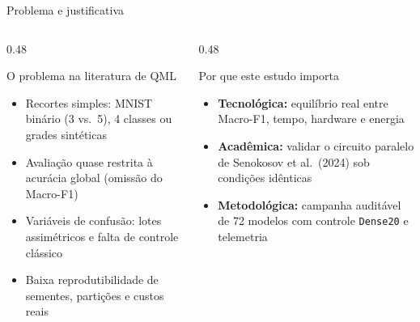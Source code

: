 \documentclass[aspectratio=169,11pt,brazil]{beamer}
\newcommand{\destaque}[1]{\textcolor{senacorange}{\textbf{#1}}}
\begin{document}
\begin{frame}{Problema e justificativa}
  \begin{columns}[T,onlytextwidth]
    \begin{column}{0.48\textwidth}
      \begin{block}{O problema na literatura de QML}
        \begin{itemize}\setlength{\itemsep}{4pt}
          \item Recortes simples: MNIST binário (3 vs.\ 5), 4 classes ou grades sintéticas
          \item Avaliação quase restrita à acurácia global (omissão do Macro-F1)
          \item Variáveis de confusão: lotes assimétricos e falta de controle clássico
          \item Baixa reprodutibilidade de sementes, partições e custos reais
        \end{itemize}
      \end{block}
    \end{column}
    \begin{column}{0.48\textwidth}
      \begin{block}{Por que este estudo importa}
        \begin{itemize}\setlength{\itemsep}{5pt}
          \item \destaque{Tecnológica:} equilíbrio real entre Macro-F1, tempo, hardware e energia
          \item \destaque{Acadêmica:} validar o circuito paralelo de Senokosov et al.\ (2024) sob condições idênticas
          \item \destaque{Metodológica:} campanha auditável de 72 modelos com controle \texttt{Dense20} e telemetria
        \end{itemize}
      \end{block}
    \end{column}
  \end{columns}
\end{frame}
\end{document}
